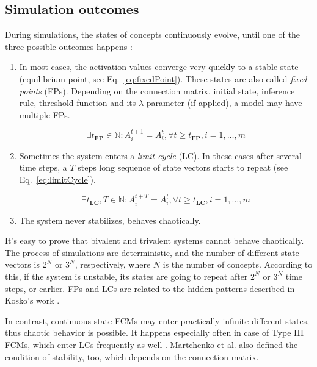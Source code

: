 \documentclass[graybox]{svmult}
\begin{document}
\subsection{Simulation outcomes}

During simulations, the states of concepts continuously evolve, until one of the three possible outcomes happens \cite{tsadiras2008comparing}:

\begin{enumerate}
  \item In most cases, the activation values converge very quickly to a stable state (equilibrium point, see Eq.~\ref{eq:fixedPoint}). These states are also called \emph{fixed points} (FPs). Depending on the connection matrix, initial state, inference rule, threshold function and its $\lambda$ parameter (if applied), a model may have multiple FPs.
  
  \begin{equation}
  \label{eq:fixedPoint}
  \exists t_{\textbf{FP}} \in \mathbb{N} : A_i^{t+1} = A_i^t, \forall t \geq t_{\textbf{FP}}, i=1, \dots, m
  \end{equation}
  
  \item Sometimes the system enters a \emph{limit cycle} (LC). In these cases after several time steps, a $T$ steps long sequence of state vectors starts to repeat (see Eq.~\ref{eq:limitCycle}).
  
  \begin{equation}
  \label{eq:limitCycle}
  \exists t_{\textbf{LC}}, T \in \mathbb{N} : A_i^{t+T} = A_i^t, \forall t \geq t_{\textbf{LC}}, i=1, \dots, m
  \end{equation}
  
  \item The system never stabilizes, behaves chaotically.
\end{enumerate}

It's easy to prove that bivalent and trivalent systems cannot behave chaotically. The process of simulations are deterministic, and the number of different state vectors is $2^N$ or $3^N$, respectively, where $N$ is the number of concepts. According to this, if the system is unstable, its states are going to repeat after $2^N$ or $3^N$ time steps, or earlier. FPs and LCs are related to the hidden patterns described in Kosko's work \cite{kosko1988hidden}.

In contrast, continuous state FCMs may enter practically infinite different states, thus chaotic behavior is possible. It happens especially often in case of Type III FCMs, which enter LCs frequently as well \cite{martchenko2003investigating}. Martchenko et al. also defined the condition of stability, too, which depends on the connection matrix.
\end{document}
